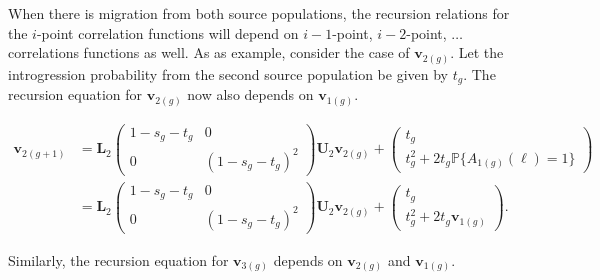 \documentclass[11pt]{amsart}
\begin{document}
When there is migration from both source populations, the recursion relations for the $i$-point correlation functions will depend on $i-1$-point, $i-2$-point, $\dots$ correlations functions as well. As as example, consider the case of $\textbf{v}_{2(g)}$. Let the introgression probability from the second source population be given by $t_g$.
The recursion equation for $\textbf{v}_{2(g)}$ now also depends on $\mathbf{v}_{1(g)}$.

\begin{align*}
\textbf{v}_{2(g+1)}&=\textbf{L}_2\left( \begin{array}{cc}
					 1-s_g-t_g		& 0 \\
					 0 	& (1-s_g-t_g)^2
				\end{array} \right)\textbf{U}_2\textbf{v}_{2(g)}+ 
				\left( \begin{array}{c}
					 t_g \\
					 t_g^2+2t_g\mathbb{P}\{A_{1(g)}(\ell)=1\}
				\end{array} \right)\\
				&=\textbf{L}_2\left( \begin{array}{cc}
					 1-s_g-t_g		& 0 \\
					 0 	& (1-s_g-t_g)^2
				\end{array} \right)\textbf{U}_2\textbf{v}_{2(g)}+ 
				\left( \begin{array}{c}
					 t_g \\
					 t_g^2+2t_g\mathbf{v}_{1(g)}
				\end{array} \right).
\end{align*}

Similarly, the recursion equation for $\textbf{v}_{3(g)}$ depends on $\mathbf{v}_{2(g)}$ and $\mathbf{v}_{1(g)}$. 
\end{document}
